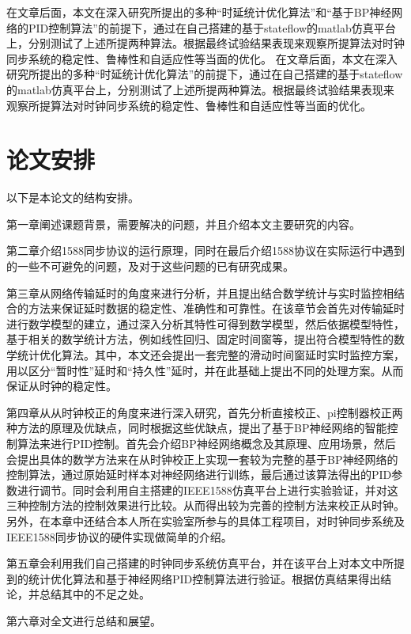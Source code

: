 在文章后面，本文在深入研究所提出的多种“时延统计优化算法”和“基于BP神经网络的PID控制算法”的前提下，通过在自己搭建的基于stateflow的matlab仿真平台上，分别测试了上述所提两种算法。根据最终试验结果表现来观察所提算法对时钟同步系统的稳定性、鲁棒性和自适应性等当面的优化。
在文章后面，本文在深入研究所提出的多种“时延统计优化算法”的前提下，通过在自己搭建的基于stateflow的matlab仿真平台上，分别测试了上述所提两种算法。根据最终试验结果表现来观察所提算法对时钟同步系统的稳定性、鲁棒性和自适应性等当面的优化。

\section{论文安排}
以下是本论文的结构安排。

第一章阐述课题背景，需要解决的问题，并且介绍本文主要研究的内容。

第二章介绍1588同步协议的运行原理，同时在最后介绍1588协议在实际运行中遇到的一些不可避免的问题，及对于这些问题的已有研究成果。

第三章从网络传输延时的角度来进行分析，并且提出结合数学统计与实时监控相结合的方法来保证延时数据的稳定性、准确性和可靠性。在该章节会首先对传输延时进行数学模型的建立，通过深入分析其特性可得到数学模型，然后依据模型特性，基于相关的数学统计方法，例如线性回归、固定时间窗等，提出符合模型特性的数学统计优化算法。其中，本文还会提出一套完整的滑动时间窗延时实时监控方案，用以区分“暂时性”延时和“持久性”延时，并在此基础上提出不同的处理方案。从而保证从时钟的稳定性。

第四章从从时钟校正的角度来进行深入研究，首先分析直接校正、pi控制器校正两种方法的原理及优缺点，同时根据这些优缺点，提出了基于BP神经网络的智能控制算法来进行PID控制。首先会介绍BP神经网络概念及其原理、应用场景，然后会提出具体的数学方法来在从时钟校正上实现一套较为完整的基于BP神经网络的控制算法，通过原始延时样本对神经网络进行训练，最后通过该算法得出的PID参数进行调节。同时会利用自主搭建的IEEE1588仿真平台上进行实验验证，并对这三种控制方法的控制效果进行比较。从而得出较为完善的控制方法来校正从时钟。另外，在本章中还结合本人所在实验室所参与的具体工程项目，对时钟同步系统及IEEE1588同步协议的硬件实现做简单的介绍。

第五章会利用我们自己搭建的时钟同步系统仿真平台，并在该平台上对本文中所提到的统计优化算法和基于神经网络PID控制算法进行验证。根据仿真结果得出结论，并总结其中的不足之处。


第六章对全文进行总结和展望。
